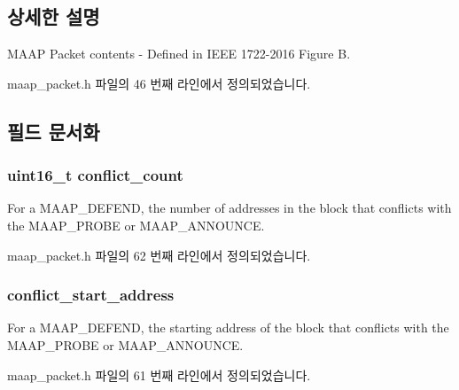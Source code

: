\subsection{상세한 설명}
M\+A\+AP Packet contents -\/ Defined in I\+E\+EE 1722-\/2016 Figure B. 

maap\+\_\+packet.\+h 파일의 46 번째 라인에서 정의되었습니다.



\subsection{필드 문서화}
\subsubsection[{\texorpdfstring{conflict\+\_\+count}{conflict_count}}]{\setlength{\rightskip}{0pt plus 5cm}uint16\+\_\+t conflict\+\_\+count}\hypertarget{struct_m_a_a_p___packet_a7454bb2b51c745c38822d008f1a322a1}{}\label{struct_m_a_a_p___packet_a7454bb2b51c745c38822d008f1a322a1}
For a M\+A\+A\+P\+\_\+\+D\+E\+F\+E\+ND, the number of addresses in the block that conflicts with the M\+A\+A\+P\+\_\+\+P\+R\+O\+BE or M\+A\+A\+P\+\_\+\+A\+N\+N\+O\+U\+N\+CE. 

maap\+\_\+packet.\+h 파일의 62 번째 라인에서 정의되었습니다.

\subsubsection[{\texorpdfstring{conflict\+\_\+start\+\_\+address}{conflict_start_address}}]{ conflict\+\_\+start\+\_\+address}\hypertarget{struct_m_a_a_p___packet_a75c1b7fade099765ff29a3302e3ad072}{}\label{struct_m_a_a_p___packet_a75c1b7fade099765ff29a3302e3ad072}
For a M\+A\+A\+P\+\_\+\+D\+E\+F\+E\+ND, the starting address of the block that conflicts with the M\+A\+A\+P\+\_\+\+P\+R\+O\+BE or M\+A\+A\+P\+\_\+\+A\+N\+N\+O\+U\+N\+CE. 

maap\+\_\+packet.\+h 파일의 61 번째 라인에서 정의되었습니다.

